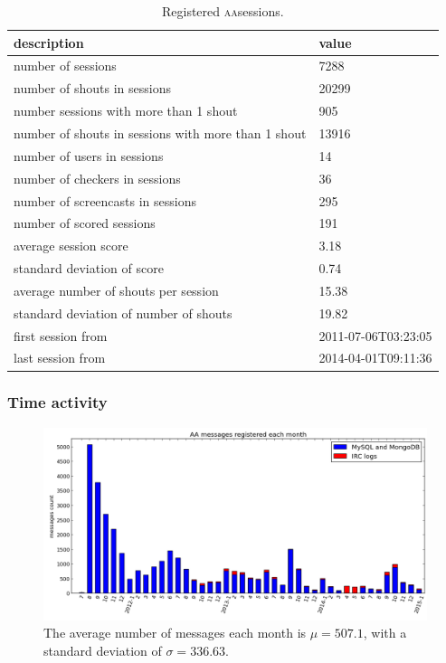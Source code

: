 \documentclass[a4paper, 11pt]{article} %
\newcommand{\aab}{\textsc{aa}}
\begin{document}
\begin{table}[!h]
  \centering
  \caption{Registered \aab sessions.}\label{tab:session}
  \begin{tabular}{|l|l|}\hline
      {\bf description} & {\bf value}   \\\hline\hline
      number of sessions & 7288 \\ \hline
      number of shouts in sessions & 20299 \\ \hline
      number sessions with more than 1 shout & 905 \\ \hline
      number of shouts in sessions with more than 1 shout & 13916 \\ \hline
      number of users in sessions & 14 \\ \hline
      number of checkers in sessions & 36 \\ \hline
      number of screencasts in sessions & 295 \\ \hline
      number of scored sessions & 191 \\ \hline
      average session score & 3.18 \\ \hline
      standard deviation of score & 0.74 \\ \hline
      average number of shouts per session & 15.38 \\ \hline
      standard deviation of number of shouts & 19.82 \\ \hline
      first session from & 2011-07-06T03:23:05 \\ \hline
      last session from & 2014-04-01T09:11:36 \\ \hline

  \end{tabular}
\end{table}


\subsubsection{Time activity}
\begin{figure}[H]
    \hspace{-25mm}
    \includegraphics[width=1.3\textwidth]{imgs/actHist}
  \caption{\small The average number of messages each month is $\mu=507.1$, with a standard deviation of $\sigma=336.63 $.}\label{fig:mAct}
\end{figure}
\end{document}
